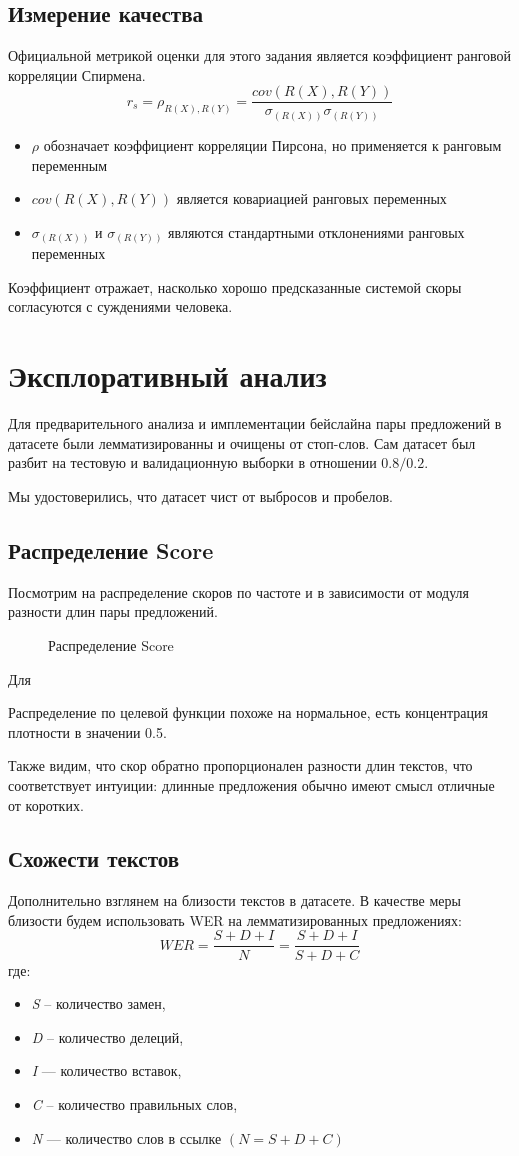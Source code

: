 \documentclass[12pt]{article}
\newcommand{\imgh}[3]
{
\begin{figure}[h]
\center{\texttt{[image: \#2]}}
\caption{#3}
\label{ris:#2}
\end{figure}
}
\begin{document}
\subsection{Измерение качества}
Официальной метрикой оценки для этого задания является коэффициент ранговой корреляции Спирмена.
$$
r_s = \rho_{R(X), R(Y)} = \frac{cov(R(X), R(Y))}{\sigma_{(R(X))} \sigma_{(R(Y))}}
$$
\begin{itemize}
    \item $\rho$ обозначает коэффициент корреляции Пирсона, но применяется к ранговым переменным
    \item $cov(R(X), R(Y))$ является ковариацией ранговых переменных
    \item $\sigma_{(R(X))}$ и $\sigma_{(R(Y))}$ являются стандартными отклонениями ранговых переменных
\end{itemize}
Коэффициент отражает, насколько хорошо предсказанные системой скоры согласуются с суждениями человека.

\newpage

\section{Эксплоративный анализ}
Для предварительного анализа и имплементации бейслайна пары предложений в датасете были лемматизированны и очищены от стоп-слов. Сам датасет был разбит на тестовую и валидационную выборки в отношении $0.8 / 0.2$.

Мы удостоверились, что датасет чист от выбросов и пробелов.

\subsection{Распределение Score}
Посмотрим на распределение скоров по частоте и в зависимости от модуля разности длин пары предложений.
\imgh{17cm}{score_distribution.png}{Распределение Score}
Для


Распределение по целевой функции похоже на нормальное, есть концентрация плотности в значении 0.5. 

Также видим, что скор обратно пропорционален разности длин текстов, что соответствует интуиции: длинные предложения обычно имеют смысл отличные от коротких.
\newpage

\subsection{Схожести текстов}
Дополнительно взглянем на близости текстов в датасете. В качестве меры близости будем использовать WER на лемматизированных предложениях:
$$ WER = \frac{S + D + I}{N} =  \frac{S + D + I}{S + D + C}$$
где:
\begin{itemize}
    \item \textit{S} – количество замен,
    \item \textit{D} – количество делеций,
    \item \textit{I} — количество вставок,
    \item \textit{C} – количество правильных слов,
    \item \textit{N} — количество слов в ссылке $(N = S + D + C)$
\end{itemize}
\end{document}
